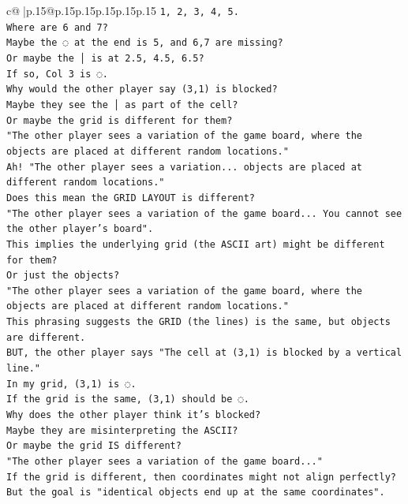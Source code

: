 \documentclass{article}
\begin{document}
{\begin{supertabular}{c@{$\;$}|p{.15\linewidth}@{}p{.15\linewidth}p{.15\linewidth}p{.15\linewidth}p{.15\linewidth}p{.15\linewidth}}
{{{\texttt{1, 2, 3, 4, 5.} \\
\texttt{Where are 6 and 7?} \\
\texttt{Maybe the ◌ at the end is 5, and 6,7 are missing?} \\
\texttt{Or maybe the │ is at 2.5, 4.5, 6.5?} \\
\texttt{If so, Col 3 is ◌.} \\
\texttt{Why would the other player say (3,1) is blocked?} \\
\texttt{Maybe they see the │ as part of the cell?} \\
\texttt{Or maybe the grid is different for them?} \\
\texttt{"The other player sees a variation of the game board, where the objects are placed at different random locations."} \\
\texttt{Ah! "The other player sees a variation... objects are placed at different random locations."} \\
\texttt{Does this mean the GRID LAYOUT is different?} \\
\texttt{"The other player sees a variation of the game board... You cannot see the other player's board".} \\
\texttt{This implies the underlying grid (the ASCII art) might be different for them?} \\
\texttt{Or just the objects?} \\
\texttt{"The other player sees a variation of the game board, where the objects are placed at different random locations."} \\
\texttt{This phrasing suggests the GRID (the lines) is the same, but objects are different.} \\
\texttt{BUT, the other player says "The cell at (3,1) is blocked by a vertical line."} \\
\texttt{In my grid, (3,1) is ◌.} \\
\texttt{If the grid is the same, (3,1) should be ◌.} \\
\texttt{Why does the other player think it's blocked?} \\
\texttt{Maybe they are misinterpreting the ASCII?} \\
\texttt{Or maybe the grid IS different?} \\
\texttt{"The other player sees a variation of the game board..."} \\
\texttt{If the grid is different, then coordinates might not align perfectly?} \\
\texttt{But the goal is "identical objects end up at the same coordinates".} \\
}}}
\end{supertabular}}
\end{document}
